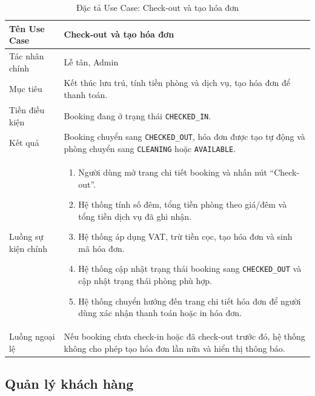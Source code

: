 \documentclass[13pt,a4paper]{extreport}
\begin{document}
\begin{table}[H]
\centering
\caption{Đặc tả Use Case: Check-out và tạo hóa đơn}
\label{tab:uc-checkout}
\begin{tabular}{p{4cm}p{10cm}}
\hline
Tên Use Case & Check-out và tạo hóa đơn\\
\hline
Tác nhân chính & Lễ tân, Admin\\
Mục tiêu & Kết thúc lưu trú, tính tiền phòng và dịch vụ, tạo hóa đơn để thanh toán.\\
Tiền điều kiện & Booking đang ở trạng thái \texttt{CHECKED\_IN}.\\
Kết quả & Booking chuyển sang \texttt{CHECKED\_OUT}, hóa đơn được tạo tự động và phòng chuyển sang \texttt{CLEANING} hoặc \texttt{AVAILABLE}.\\
\hline
Luồng sự kiện chính &
\begin{enumerate}
  \item Người dùng mở trang chi tiết booking và nhấn nút ``Check-out''.
  \item Hệ thống tính số đêm, tổng tiền phòng theo giá/đêm và tổng tiền dịch vụ đã ghi nhận.
  \item Hệ thống áp dụng VAT, trừ tiền cọc, tạo hóa đơn và sinh mã hóa đơn.
  \item Hệ thống cập nhật trạng thái booking sang \texttt{CHECKED\_OUT} và cập nhật trạng thái phòng phù hợp.
  \item Hệ thống chuyển hướng đến trang chi tiết hóa đơn để người dùng xác nhận thanh toán hoặc in hóa đơn.
\end{enumerate}\\
\hline
Luồng ngoại lệ &
Nếu booking chưa check-in hoặc đã check-out trước đó, hệ thống không cho phép tạo hóa đơn lần nữa và hiển thị thông báo.\\
\hline
\end{tabular}
\end{table}

\subsection*{Quản lý khách hàng}
\end{document}
